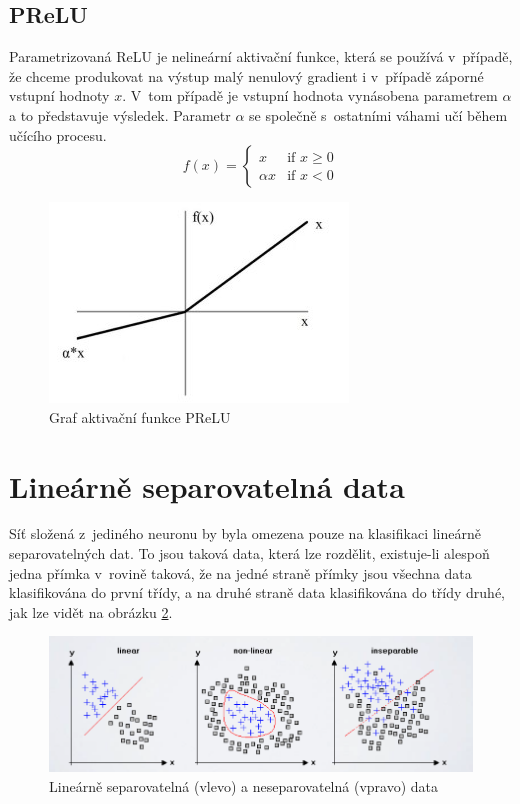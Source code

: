 \subsection*{PReLU}
Parametrizovaná ReLU je nelineární aktivační funkce, která se používá v~případě, že chceme produkovat na výstup malý nenulový gradient i v~případě záporné vstupní hodnoty $x$. V~tom případě je vstupní hodnota vynásobena parametrem $\alpha$ a to představuje výsledek. Parametr $\alpha$ se společně s~ostatními váhami učí během učícího procesu.
\begin{equation}
  f(x) =
  \begin{cases}
    x & \text{if } x \geq 0 \\
    {\alpha}x & \text{if } x < 0
  \end{cases}
\end{equation}

\begin{figure}[H]
    \centering
    \includegraphics[scale=1.4]{obrazky-figures/prelu.jpg}
    \caption{\label{fig:prelu}Graf aktivační funkce PReLU}
\end{figure}


\section{Lineárně separovatelná data}
Síť složená z~jediného neuronu by byla omezena pouze na klasifikaci lineárně separovatelných dat. To jsou taková data, která lze rozdělit, existuje-li alespoň jedna přímka v~rovině taková, že na jedné straně přímky jsou všechna data klasifikována do první třídy, a na druhé straně data klasifikována do třídy druhé, jak lze vidět na obrázku \ref{fig:linear_separable}.

\begin{figure}[H]
    \centering
    \includegraphics[scale=0.38]{obrazky-figures/linear_separable.png}
    \caption{\label{fig:linear_separable}Lineárně separovatelná (vlevo) a neseparovatelná (vpravo) data} 
\end{figure}

